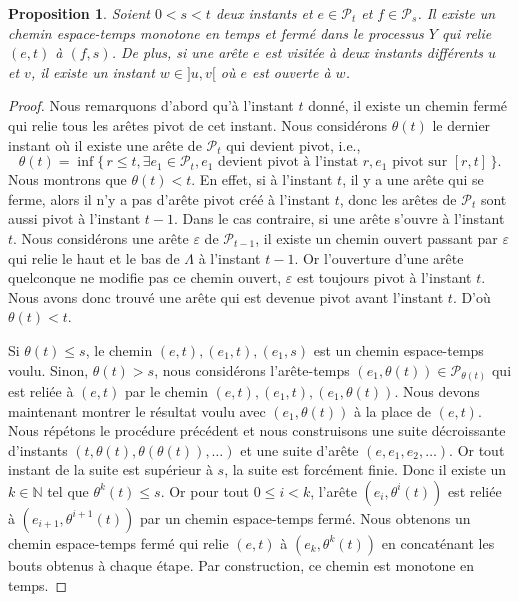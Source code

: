 \documentclass[titlepage,a4paper,12pt]{article}
\newcounter{th}
\newcounter{propo}
\newtheorem{prop}[propo]{Proposition}
\begin{document}
\begin{prop} \label{stc}Soient $0<s<t$ deux instants et $e\in \mathcal{P}_t$ et $f \in \mathcal{P}_s$. Il existe un chemin espace-temps monotone en temps et fermé dans le processus $Y$ qui relie $(e,t)$ à $(f,s)$. De plus, si une arête $e$ est visitée à deux instants différents $u$ et $v$, il existe un instant $w\in ]u,v[$ où $e$ est ouverte à $w$.
\end{prop}

\begin{proof}
Nous remarquons d'abord qu'à l'instant $t$ donné, il existe un chemin fermé qui relie tous les arêtes pivot de cet instant. Nous considérons $\theta(t)$ le dernier instant où il existe une arête de $\mathcal{P}_t$ qui devient pivot, i.e.,
$$ \theta(t) = \inf\big\{ \,r\leqslant t, \exists e_1 \in \mathcal{P}_t, e_1 \text{ devient pivot à l'instat } r,e_1\text{ pivot sur }[r,t]\, \big\}.
$$
Nous montrons que $\theta(t)< t$. En effet, si à l'instant $t$, il y a une arête qui se ferme, alors il n'y a pas d'arête pivot créé à l'instant $t$, donc les arêtes de $\mathcal{P}_t$ sont aussi pivot à l'instant $t-1$. Dans le cas contraire, si une arête s'ouvre à l'instant $t$. Nous considérons une arête $\varepsilon$ de $\mathcal{P}_{t-1}$, il existe un chemin ouvert passant par $\varepsilon$ qui relie le haut et le bas de $\Lambda$ à l'instant $t-1$. Or l'ouverture d'une arête quelconque ne modifie pas ce chemin ouvert, $\varepsilon$ est toujours pivot à l'instant $t$. Nous avons donc trouvé une arête qui est devenue pivot avant l'instant $t$. D'où $\theta(t)< t$.

Si $\theta(t)\leqslant s$, le chemin $(e,t),(e_1,t),(e_1,s)$ est un chemin espace-temps voulu. Sinon, $\theta(t)> s$, nous considérons l'arête-temps $(e_1,\theta(t))\in \mathcal{P}_{\theta(t)}$ qui est reliée à $(e,t)$ par le chemin $(e,t),(e_1,t),(e_1,\theta(t))$. Nous devons maintenant montrer le résultat voulu avec $(e_1,\theta(t))$ à la place de $(e,t)$. Nous répétons le procédure précédent et nous construisons une suite décroissante d'instants $(t,\theta(t),\theta(\theta(t)),\dots)$ et une suite d'arête $(e,e_1,e_2,\dots)$. Or tout instant de la suite est supérieur à $s$, la suite est forcément finie. Donc il existe un $k\in\mathbb{N}$ tel que $\theta^k(t)\leqslant s$. Or pour tout $0\leqslant i < k$, l'arête $(e_i,\theta^i(t))$ est reliée à $(e_{i+1},\theta^{i+1}(t))$ par un chemin espace-temps fermé. Nous obtenons un chemin espace-temps fermé qui relie $(e,t)$ à $(e_k,\theta^k(t))$ en concaténant les bouts obtenus à chaque étape. Par construction, ce chemin est monotone en temps. 


\end{proof}
\end{document}
